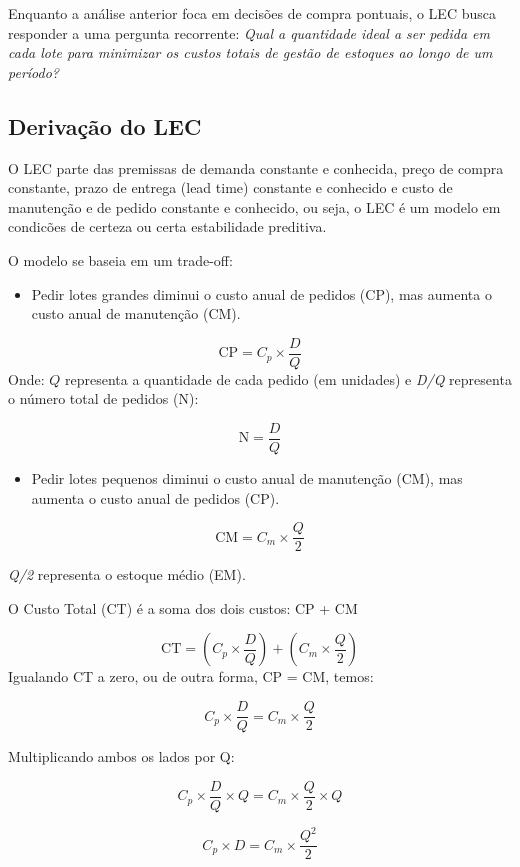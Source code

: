 \documentclass[
  a4paper,
]{book}
\providecommand{\tightlist}{%
  \setlength{\itemsep}{0pt}\setlength{\parskip}{0pt}}\usepackage{longtable,booktabs,array}
\begin{document}
Enquanto a análise anterior foca em decisões de compra pontuais, o LEC
busca responder a uma pergunta recorrente: \emph{Qual a quantidade ideal
a ser pedida em cada lote para minimizar os custos totais de gestão de
estoques ao longo de um período?}

\subsection{Derivação do LEC}\label{derivauxe7uxe3o-do-lec}

O LEC parte das premissas de demanda constante e conhecida, preço de
compra constante, prazo de entrega (lead time) constante e conhecido e
custo de manutenção e de pedido constante e conhecido, ou seja, o LEC é
um modelo em condicões de certeza ou certa estabilidade preditiva.

O modelo se baseia em um trade-off:

\begin{itemize}
\tightlist
\item
  Pedir lotes grandes diminui o custo anual de pedidos (CP), mas aumenta
  o custo anual de manutenção (CM).
\end{itemize}

\[
\text{CP} = C_p \times \frac{D}{Q}
\] Onde: \(Q\) representa a quantidade de cada pedido (em unidades) e
\emph{D/Q} representa o número total de pedidos (N):

\[
\text{N} = \frac{D}{Q}
\]

\begin{itemize}
\tightlist
\item
  Pedir lotes pequenos diminui o custo anual de manutenção (CM), mas
  aumenta o custo anual de pedidos (CP).
\end{itemize}

\[
\text{CM} = C_m \times \frac{Q}{2}
\]

\emph{Q/2} representa o estoque médio (EM).

O Custo Total (CT) é a soma dos dois custos: CP + CM

\[
\text{CT} = \left(C_p \times \frac{D}{Q}\right) + \left(C_m \times \frac{Q}{2}\right)
\] Igualando CT a zero, ou de outra forma, CP = CM, temos:

\[
C_p \times \frac{D}{Q} = C_m \times \frac{Q}{2}
\]

Multiplicando ambos os lados por Q:

\[
C_p \times \frac{D}{Q} \times Q = C_m \times \frac{Q}{2} \times Q
\]

\[
C_p \times D = C_m \times \frac{Q^2}{2}
\]
\end{document}
